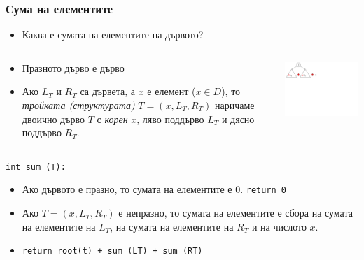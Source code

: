 \documentclass{beamer}
\begin{document}
    
    
    
    
    \begin{frame}[fragile]
    \frametitle{Сума на елементите}
    
        \begin{itemize}
          \item Каква е сумата на елементите на дървото?
        \end{itemize}
    
    
    \begin{columns}[t]
      \begin{column}{0.65\textwidth}
    
        \begin{flushleft}
        \begin{itemize}
          \item Празното дърво е дърво
          \item Ако $L_T$ и $R_T$ са дървета, а $x$ е елемент ($x \in D$), то \emph{тройката (структурата)} $T=(x,L_T,R_T)$ наричаме двоично дърво $T$ с \emph{корен} $x$, ляво поддърво $L_T$ и дясно поддърво $R_T$.
        \end{itemize}
        \end{flushleft}
    
      \end{column}
      \begin{column}{0.35\textwidth}
    
        \includegraphics[width=8cm]{images/tree_recursive_op_sum}
    
      \end{column}
    \end{columns}
    
    \vspace{-100px}
    
     \texttt{int sum (T):}
    
        \begin{itemize}
          \item Ако дървото е празно, то сумата на елементите е $0$. \texttt{return 0}
          \item  Ако $T=(x,L_T,R_T)$ е непразно, то сумата на елементите е сбора на сумата на елементите на $L_T$, на сумата на елементите на $R_T$ и на числото $x$.
          \item \texttt{return root(t) + sum (LT) + sum (RT)}
        \end{itemize}
    
    \end{frame}
    
\end{document}
